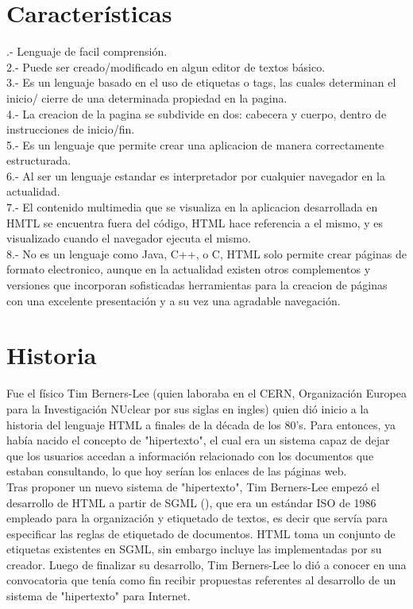 \documentclass[11pt]{article} %
\begin{document}
\section{Características}

.- Lenguaje de facil comprensión.\\
2.- Puede ser creado/modificado en algun editor de textos básico.\\
3.- Es un lenguaje basado en el uso de etiquetas o tags, las cuales determinan el inicio/ cierre de una determinada propiedad en la pagina.\\
4.- La creacion de la pagina se subdivide en dos: cabecera y cuerpo, dentro de instrucciones de inicio/fin.\\ 
5.- Es un lenguaje que permite crear una aplicacion de manera correctamente estructurada.\\
6.- Al ser un lenguaje estandar es interpretador por cualquier navegador en la actualidad.\\
7.- El contenido multimedia que se visualiza en la aplicacion desarrollada en HMTL se encuentra fuera del código, HTML hace referencia a el mismo, y es visualizado cuando el navegador ejecuta el mismo.\\
8.- No es un lenguaje como Java, C++, o C, HTML solo permite crear páginas de formato electronico, aunque en la actualidad existen otros complementos y versiones que incorporan sofisticadas herramientas para la creacion de páginas con una excelente presentación y a su vez una agradable navegación.\\


\section{Historia}

\noindent Fue el físico Tim Berners-Lee (quien laboraba en el CERN, Organización Europea para la Investigación NUclear por sus siglas en ingles) quien dió inicio a la historia del lenguaje HTML a finales de la década de los 80's. Para entonces, ya había nacido el concepto de "hipertexto", el cual era un sistema capaz de dejar que los usuarios accedan a información relacionado con los documentos que estaban consultando, lo que hoy serían los enlaces de las páginas web.\\

\noindent Tras proponer un nuevo sistema de "hipertexto", Tim Berners-Lee empezó el desarrollo de HTML a partir de SGML (), que era un estándar ISO de 1986 empleado para la organización y etiquetado de textos, es decir que servía para especificar las reglas de etiquetado de documentos. HTML toma un conjunto de etiquetas existentes en SGML, sin embargo incluye las implementadas por su creador. Luego de finalizar su desarrollo, Tim Berners-Lee lo dió a conocer en  una convocatoria que tenía como fin recibir propuestas referentes al desarrollo de un sistema de "hipertexto" para Internet.\\
\end{document}
